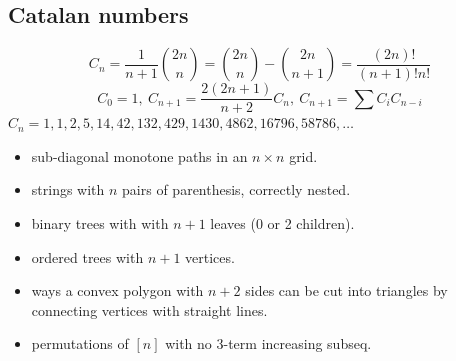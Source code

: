 	\subsection{Catalan numbers}
		\[ C_n=\frac{1}{n+1}\binom{2n}{n}= \binom{2n}{n}-\binom{2n}{n+1} = \frac{(2n)!}{(n+1)!n!} \]
		\[ C_0=1,\ C_{n+1} = \frac{2(2n+1)}{n+2}C_n,\ C_{n+1}=\sum C_iC_{n-i} \]
		${C_n = 1, 1, 2, 5, 14, 42, 132, 429, 1430, 4862, 16796, 58786, \dots}$
		\begin{itemize}[noitemsep]
			\item sub-diagonal monotone paths in an $n\times n$ grid.
			\item strings with $n$ pairs of parenthesis, correctly nested.
			\item binary trees with with $n+1$ leaves (0 or 2 children).
			\item ordered trees with $n+1$ vertices.
			\item ways a convex polygon with $n+2$ sides can be cut into triangles by connecting vertices with straight lines.
			\item permutations of $[n]$ with no 3-term increasing subseq.
		\end{itemize}

